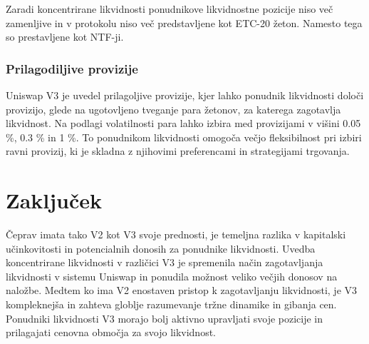\documentclass[a4paper,12pt]{article}%
\begin{document}
Zaradi koncentrirane likvidnosti ponudnikove likvidnostne pozicije niso več zamenljive in v protokolu niso več predstavljene kot ETC-20 žeton. Namesto tega so prestavljene kot NTF-ji. 


\subsubsection{Prilagodiljive provizije}
Uniswap V3 je uvedel prilagoljive provizije, kjer lahko ponudnik likvidnosti določi provizijo, glede na ugotovljeno tveganje para žetonov, za katerega zagotavlja likvidnost. Na podlagi volatilnosti para lahko izbira med provizijami v višini 0.05 \%, 0.3 \% in 1 \%. 
To ponudnikom likvidnosti omogoča večjo fleksibilnost pri izbiri ravni provizij, ki je skladna z njihovimi preferencami in strategijami trgovanja.



\section{Zaključek}

Čeprav imata tako V2 kot V3 svoje prednosti, je temeljna razlika v kapitalski učinkovitosti in potencialnih donosih za ponudnike likvidnosti. Uvedba koncentrirane likvidnosti v različici V3 je spremenila način zagotavljanja likvidnosti v sistemu Uniswap in ponudila možnost veliko večjih donosov na naložbe. Medtem ko ima V2 enostaven pristop k zagotavljanju likvidnosti, je V3 kompleknejša in zahteva globlje razumevanje tržne dinamike in gibanja cen. Ponudniki likvidnosti V3 morajo bolj aktivno upravljati svoje pozicije in prilagajati cenovna območja za svojo likvidnost. 




\end{document}
